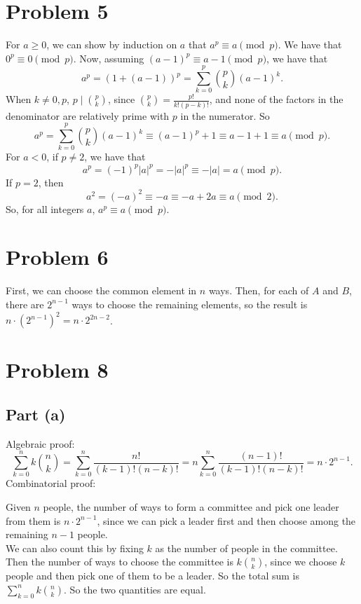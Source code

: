 \documentclass{article}
\begin{document}
\section*{Problem 5}
For $a \ge 0$, we can show by induction on $a$ that $a^p \equiv a \pmod{p}$. We have that $0^p \equiv 0 \pmod{p}$. Now, assuming $(a - 1)^p \equiv a - 1 \pmod{p}$, we have that
$$a^p = (1 + (a - 1))^p = \sum_{k = 0}^p \binom{p}{k}(a - 1)^k.$$
When $k \neq 0, p$, $p\mid\binom{p}{k}$, since $\binom{p}{k} = \frac{p!}{k!(p - k)!}$, and none of the factors in the denominator are relatively prime with $p$ in the numerator. So
$$a^p = \sum_{k = 0}^p \binom{p}{k}(a - 1)^k \equiv (a - 1)^p + 1 \equiv a - 1 + 1 \equiv a \pmod{p}.$$
For $a < 0$, if $p \neq 2$, we have that
$$a^p = (-1)^p|a|^p = -|a|^p \equiv -|a| = a \pmod{p}.$$
If $p = 2$, then
$$a^2 = (-a)^2 \equiv -a \equiv -a + 2a \equiv a \pmod{2}.$$
So, for all integers $a$, $a^p \equiv a \pmod{p}$.

\section*{Problem 6}
First, we can choose the common element in $n$ ways. Then, for each of $A$ and $B$, there are $2^{n - 1}$ ways to choose the remaining elements, so the result is $n \cdot (2^{n - 1})^2 = n \cdot 2^{2n - 2}$.

\section*{Problem 8}
\subsection*{Part (a)}
Algebraic proof:
$$\sum_{k = 0}^n k\binom{n}{k} = \sum_{k = 0}^n \frac{n!}{(k - 1)!(n - k)!} = n\sum_{k = 0}^n \frac{(n - 1)!}{(k - 1)!(n - k)!} = n\cdot 2^{n - 1}.$$
Combinatorial proof:

Given $n$ people, the number of ways to form a committee and pick one leader from them is $n \cdot 2^{n - 1}$, since we can pick a leader first and then choose among the remaining $n - 1$ people. \\

We can also count this by fixing $k$ as the number of people in the committee. Then the number of ways to choose the committee is $k\binom{n}{k}$, since we choose $k$ people and then pick one of them to be a leader. So the total sum is $\sum_{k = 0}^n k\binom{n}{k}$. So the two quantities are equal.
\end{document}
